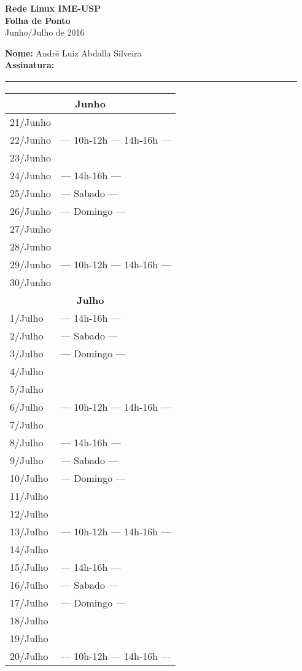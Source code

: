 \documentclass[12pt,a4paper]{article}
\begin{document}
\newcommand{\sab}{--- Sabado ---}
\newcommand{\dom}{--- Domingo ---}
\newcommand{\fer}{--- Feriado ---}
\newcommand{\seg}{}
\newcommand{\ter}{}
\newcommand{\qua}{--- 10h-12h --- 14h-16h --- }
\newcommand{\qui}{}
\newcommand{\sex}{--- 14h-16h --- }

\thispagestyle{empty}
\begin{center}
\Huge
\textbf{Rede Linux IME-USP\\Folha de Ponto}
\\
\large
Junho/Julho de 2016
\end{center}

\large
\noindent \textbf{Nome:} André Luiz Abdalla Silveira
 \\
\textbf{Assinatura:}
\underline{~~~~~~~~~~~~~~~~~~~~~~~~~~~~~~~~~~~~~~~~~~~~~~~~~~~~~~~~~~~~~~~~~~~~}
\\
\normalsize
\begin{center}
\begin{tabular}{|p{3.5cm}|p{9cm}|}
\hline
\multicolumn{2}{|c|}{\textbf{Junho}} \\ \hline
21/Junho & \ter \\ \hline
22/Junho & \qua \\ \hline
23/Junho & \qui \\ \hline
24/Junho & \sex \\ \hline
25/Junho & \sab \\ \hline
26/Junho & \dom \\ \hline
27/Junho & \seg \\ \hline
28/Junho & \ter \\ \hline
29/Junho & \qua \\ \hline
30/Junho & \qui \\ \hline
\multicolumn{2}{|c|}{\textbf{Julho}} \\ \hline
1/Julho & \sex \\ \hline
2/Julho & \sab \\ \hline
3/Julho & \dom \\ \hline
4/Julho & \seg \\ \hline
5/Julho & \ter \\ \hline
6/Julho & \qua \\ \hline
7/Julho & \qui \\ \hline
8/Julho & \sex \\ \hline
9/Julho & \sab \\ \hline
10/Julho & \dom \\ \hline
11/Julho & \seg \\ \hline
12/Julho & \ter \\ \hline
13/Julho & \qua \\ \hline
14/Julho & \qui \\ \hline
15/Julho & \sex \\ \hline
16/Julho & \sab \\ \hline
17/Julho & \dom \\ \hline
18/Julho & \seg \\ \hline
19/Julho & \ter \\ \hline
20/Julho & \qua \\ \hline
\end{tabular}
\end{center}
\end{document}
